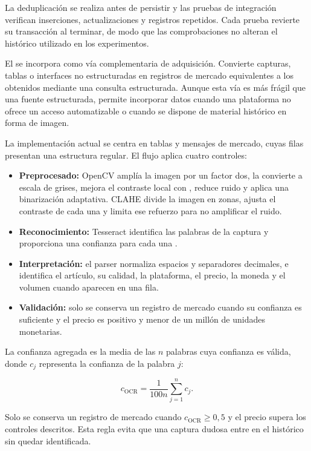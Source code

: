 La deduplicación se realiza antes de persistir y las pruebas de integración verifican inserciones, actualizaciones y registros repetidos. Cada prueba revierte su transacción al terminar, de modo que las comprobaciones no alteran el histórico utilizado en los experimentos.

El  se incorpora como vía complementaria de adquisición. Convierte capturas, tablas o interfaces no estructuradas en registros de mercado equivalentes a los obtenidos mediante una consulta estructurada. Aunque esta vía es más frágil que una fuente estructurada, permite incorporar datos cuando una plataforma no ofrece un acceso automatizable o cuando se dispone de material histórico en forma de imagen.

La implementación actual se centra en tablas y mensajes de mercado, cuyas filas presentan una estructura regular. El flujo aplica cuatro controles:

\begin{itemize}
  \item \textbf{Preprocesado:} OpenCV \cite{bradski2000opencv} amplía la imagen por un factor dos, la convierte a escala de grises, mejora el contraste local con  \cite{zuiderveld1994clahe}, reduce ruido y aplica una binarización adaptativa. CLAHE divide la imagen en zonas, ajusta el contraste de cada una y limita ese refuerzo para no amplificar el ruido.
  \item \textbf{Reconocimiento:} Tesseract identifica las palabras de la captura y proporciona una confianza para cada una \cite{smith2007tesseract}.
  \item \textbf{Interpretación:} el parser normaliza espacios y separadores decimales, e identifica el artículo, su calidad, la plataforma, el precio, la moneda y el volumen cuando aparecen en una fila.
  \item \textbf{Validación:} solo se conserva un registro de mercado cuando su confianza es suficiente y el precio es positivo y menor de un millón de unidades monetarias.
\end{itemize}

La confianza agregada es la media de las $n$ palabras cuya confianza es válida, donde $c_j$ representa la confianza de la palabra $j$:

\[
c_{\mathrm{OCR}}=\frac{1}{100n}\sum_{j=1}^{n} c_j.
\]

Solo se conserva un registro de mercado cuando $c_{\mathrm{OCR}}\geq 0{,}5$ y el precio supera los controles descritos. Esta regla evita que una captura dudosa entre en el histórico sin quedar identificada.


